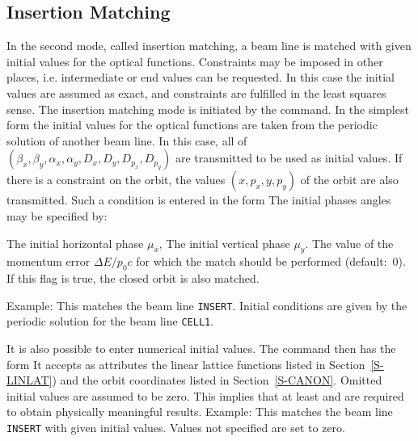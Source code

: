 \subsection{Insertion Matching}
In the second mode, called insertion matching,
a beam line is matched with given initial values
for the optical functions.
Constraints may be imposed in other places,
i.e. intermediate or end values can be requested.
In this case the initial values are assumed as exact,
and constraints are fulfilled in the least squares sense.
The insertion matching mode is initiated by the  command.
In the simplest form the initial values for the optical
functions are taken from the periodic solution of another beam line.
In this case, all of
\((\beta_{x}, \beta_{y}, \alpha_{x}, \alpha_{y},
D_{x}, D_{y}, D_{p_{x}}, D_{p_{y}})\)
are transmitted to be used as initial values.
If there is a constraint on the orbit,
the values \((x, p_x, y, p_y)\) of the orbit are also transmitted.
Such a condition is entered in the form
The initial phases angles may be specified by:
\begin{mylist}
The initial horizontal phase \(\mu_x\),
The initial vertical phase \(\mu_y\).
The value of the momentum error
\(\Delta E/p_0 c\) for which the match should be performed
(default:~0).
If this flag is true, the closed orbit is also matched.
\end{mylist}
Example:
This matches the beam line {\tt INSERT}.
Initial conditions are given by the periodic solution for
the beam line {\tt CELL1}.
 
It is also possible to enter numerical initial values.
The  command then has the form
It accepts as attributes the linear lattice functions
listed in Section~\ref{S-LINLAT})
and the orbit coordinates listed in Section~\ref{S-CANON}.
Omitted initial values are assumed to be zero.
This implies that at least  and 
are required to obtain physically meaningful results.
Example:
This matches the beam line {\tt INSERT} with given initial values.
Values not specified are set to zero.
 
